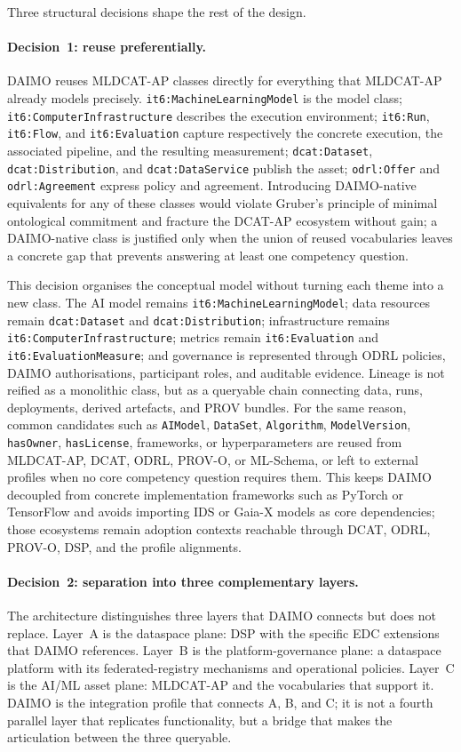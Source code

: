 \documentclass[Afour,sagev,times]{sagej}
\newcommand{\code}[1]{\texttt{#1}}
\begin{document}
Three structural decisions shape the rest of the design.

\paragraph{Decision~1: reuse preferentially.} DAIMO reuses MLDCAT-AP classes directly for everything that MLDCAT-AP already models precisely. \code{it6:MachineLearningModel} is the model class; \code{it6:ComputerInfrastructure} describes the execution environment; \code{it6:Run}, \code{it6:Flow}, and \code{it6:Evaluation} capture respectively the concrete execution, the associated pipeline, and the resulting measurement; \code{dcat:Dataset}, \code{dcat:Distribution}, and \code{dcat:DataService} publish the asset; \code{odrl:Offer} and \code{odrl:Agreement} express policy and agreement. Introducing DAIMO-native equivalents for any of these classes would violate Gruber's principle of minimal ontological commitment and fracture the DCAT-AP ecosystem without gain; a DAIMO-native class is justified only when the union of reused vocabularies leaves a concrete gap that prevents answering at least one competency question.

This decision organises the conceptual model without turning each theme into a new class. The AI model remains \code{it6:MachineLearningModel}; data resources remain \code{dcat:Dataset} and \code{dcat:Distribution}; infrastructure remains \code{it6:ComputerInfrastructure}; metrics remain \code{it6:Evaluation} and \code{it6:EvaluationMeasure}; and governance is represented through ODRL policies, DAIMO authorisations, participant roles, and auditable evidence. Lineage is not reified as a monolithic class, but as a queryable chain connecting data, runs, deployments, derived artefacts, and PROV bundles. For the same reason, common candidates such as \code{AIModel}, \code{DataSet}, \code{Algorithm}, \code{ModelVersion}, \code{hasOwner}, \code{hasLicense}, frameworks, or hyperparameters are reused from MLDCAT-AP, DCAT, ODRL, PROV-O, or ML-Schema, or left to external profiles when no core competency question requires them. This keeps DAIMO decoupled from concrete implementation frameworks such as PyTorch or TensorFlow and avoids importing IDS or Gaia-X models as core dependencies; those ecosystems remain adoption contexts reachable through DCAT, ODRL, PROV-O, DSP, and the profile alignments.

\paragraph{Decision~2: separation into three complementary layers.} The architecture distinguishes three layers that DAIMO connects but does not replace. Layer~A is the dataspace plane: DSP with the specific EDC extensions that DAIMO references. Layer~B is the platform-governance plane: a dataspace platform with its federated-registry mechanisms and operational policies. Layer~C is the AI/ML asset plane: MLDCAT-AP and the vocabularies that support it. DAIMO is the integration profile that connects A, B, and C; it is not a fourth parallel layer that replicates functionality, but a bridge that makes the articulation between the three queryable.
\end{document}

